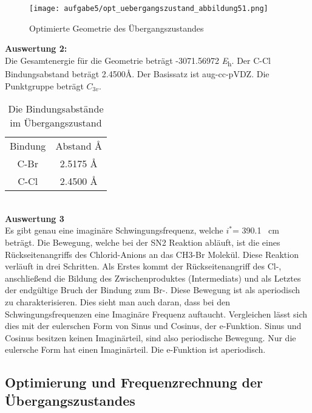 \documentclass[12pt]{article}
\begin{document}
\begin{onehalfspace}
\begin{figure}[!htbp]
\centering
  \texttt{[image: aufgabe5/opt\_uebergangszustand\_abbildung51.png]}%
  \caption{Optimierte Geometrie des Übergangszustandes}
\end{figure}
\noindent
\textbf{Auswertung 2:}\\
 Die Gesamtenergie für die Geometrie beträgt -3071.56972 \si{\hartree}. 
Der C-Cl Bindungsabstand beträgt 2.4500\si{\angstrom}.
 Der Basissatz ist aug-cc-pVDZ. Die Punktgruppe beträgt $C _{3v}$.
\begin{table}[!htpb]
\centering
\begin{tabular}{cc}
\toprule
Bindung & Abstand \si{\angstrom}\\
C-Br  & 2.5175 \si{\angstrom}\\
C-Cl  & 2.4500 \si{\angstrom} \\
\midrule
\bottomrule
\end{tabular}
\caption{Die Bindungsabstände im Übergangszustand}
\end{table}\\
\noindent
\textbf{Auswertung 3}\\
Es gibt genau eine imaginäre Schwingungsfrequenz, welche $i^*$= 390.1 \si{\per\centi\meter} beträgt. Die Bewegung, welche bei der SN2 Reaktion abläuft, ist die eines Rückseitenangriffs des Chlorid-Anions an das CH3-Br Molekül. Diese Reaktion verläuft in drei Schritten. Als Erstes kommt der Rückseitenangriff des Cl-, anschließend die Bildung des Zwischenproduktes (Intermediats) und als Letztes der endgültige Bruch der Bindung zum Br-. Diese Bewegung ist als aperiodisch zu charakterisieren.
 Dies sieht man auch daran, dass bei den Schwingungsfrequenzen eine Imaginäre Frequenz auftaucht. Vergleichen lässt sich dies mit der eulerschen Form von Sinus und Cosinus, der e-Funktion. Sinus und Cosinus besitzen keinen Imaginärteil, sind also periodische Bewegung. Nur die eulersche Form hat einen Imaginärteil. Die e-Funktion ist aperiodisch.\\

\subsection{Optimierung und Frequenzrechnung der Übergangszustandes}


\end{onehalfspace}
\end{document}
